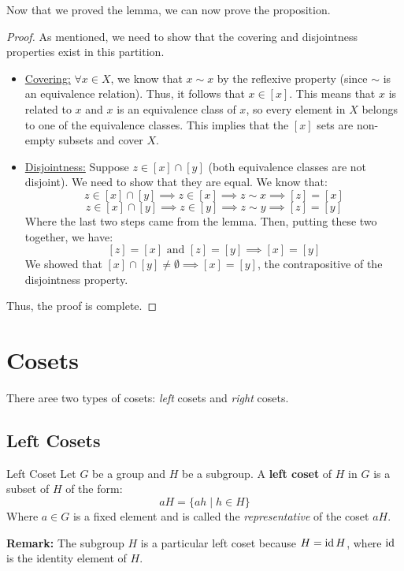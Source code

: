 \documentclass[letterpaper]{article}
\begin{document}
Now that we proved the lemma, we can now prove the proposition. 
\begin{mdframed}
    \begin{proof}
        As mentioned, we need to show that the covering and disjointness properties exist in this partition.
        \begin{itemize}
            \item \underline{Covering:} $\forall x \in X$, we know that $x \sim x$ by the reflexive property (since $\sim$ is an equivalence relation). Thus, it follows that $x \in [x]$. This means that $x$ is related to $x$ and $x$ is an equivalence class of $x$, so every element in $X$ belongs to one of the equivalence classes. This implies that the $[x]$ sets are non-empty subsets and cover $X$.
            \item \underline{Disjointness:} Suppose $z \in [x] \cap [y]$ (both equivalence classes are not disjoint). We need to show that they are equal. We know that:
            \[z \in [x] \cap [y] \implies z \in [x] \implies z \sim x \implies [z] = [x]\]
            \[z \in [x] \cap [y] \implies z \in [y] \implies z \sim y \implies [z] = [y]\]
            Where the last two steps came from the lemma. Then, putting these two together, we have:
            \[[z] = [x] \text{ and } [z] = [y] \implies [x] = [y]\]
            We showed that $[x] \cap [y] \neq \emptyset \implies [x] = [y]$, the contrapositive of the disjointness property. 
        \end{itemize}
        Thus, the proof is complete. 
    \end{proof}
\end{mdframed}











\newpage 
\section{Cosets}
There aree two types of cosets: \emph{left} cosets and \emph{right} cosets. 

\subsection{Left Cosets}
\begin{definition}{Left Coset}{}
    Let $G$ be a group and $H$ be a subgroup. A \textbf{left coset} of $H$ in $G$ is a subset of $H$ of the form:  
    \[aH = \{ah \mid h \in H\}\]
    Where $a \in G$ is a fixed element and is called the \emph{representative} of the coset $aH$. 
\end{definition}
\textbf{Remark:} The subgroup $H$ is a particular left coset because $H = \operatorname{id} H$, where $\operatorname{id}$ is the identity element of $H$. 
\end{document}
